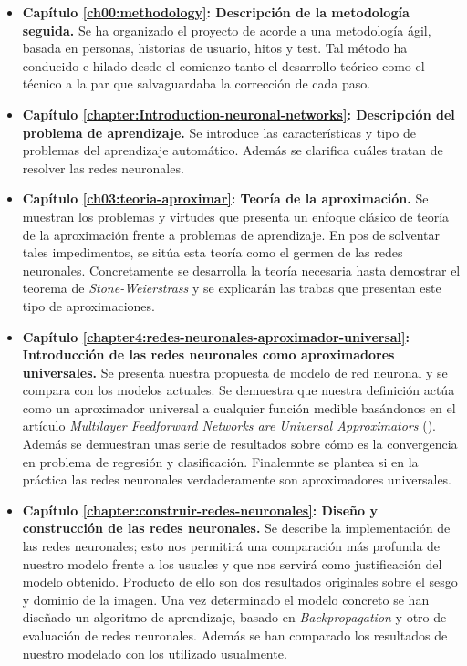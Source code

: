 \begin{itemize}
    \item \textbf{Capítulo \ref{ch00:methodology}: Descripción de la metodología seguida.} Se ha organizado el proyecto de acorde a una metodología ágil, basada en personas, historias de usuario, hitos y test. Tal método ha conducido e hilado desde el comienzo tanto el desarrollo teórico como el técnico a la par que  salvaguardaba la corrección de cada paso. 
    \item \textbf{Capítulo \ref{chapter:Introduction-neuronal-networks}: Descripción del problema de aprendizaje.} Se introduce las características y tipo de problemas del aprendizaje automático. Además se clarifica cuáles tratan de resolver las redes neuronales. 
    \item \textbf{Capítulo \ref{ch03:teoria-aproximar}: Teoría de la aproximación.} Se muestran los problemas y virtudes que presenta un enfoque clásico  de teoría de la aproximación frente a problemas de aprendizaje. En pos de solventar tales impedimentos,  
    se sitúa esta teoría como el germen de 
    las redes neuronales.
    Concretamente se desarrolla la teoría necesaria hasta demostrar el teorema de \textit{Stone-Weierstrass} y se explicarán las trabas que presentan este tipo de aproximaciones. 
    \item \textbf{Capítulo \ref{chapter4:redes-neuronales-aproximador-universal}: Introducción de las redes neuronales como aproximadores universales.} Se presenta nuestra propuesta de modelo de red neuronal y se compara con los modelos actuales. Se demuestra que nuestra definición actúa como un aproximador universal a cualquier función medible basándonos en el artículo 
    \textit{Multilayer Feedforward Networks are Universal Approximators} (\cite{HORNIK1989359}). Además se demuestran unas serie de resultados sobre cómo es la convergencia en problema de regresión y clasificación. Finalemnte se plantea si en la práctica las redes neuronales 
    verdaderamente son aproximadores universales.
    \item \textbf{Capítulo \ref{chapter:construir-redes-neuronales}: Diseño y construcción de las redes neuronales.} Se describe la implementación de las redes neuronales; esto nos permitirá una comparación  
    más profunda de nuestro modelo frente a los usuales y que nos servirá como justificación del modelo obtenido. Producto de ello son dos resultados originales sobre el sesgo y dominio de la imagen. 
    Una vez determinado el modelo concreto se
    han diseñado un algoritmo de aprendizaje, basado en \textit{Backpropagation} y otro de evaluación de redes neuronales. Además se han comparado los resultados de nuestro modelado con los utilizado usualmente. 

\end{itemize}
